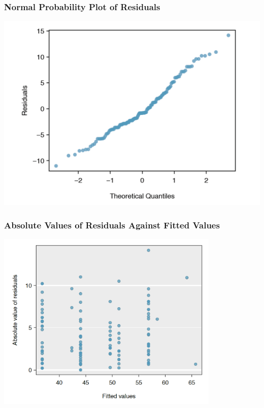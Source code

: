 \documentclass[handout]{beamer}
\begin{document}
\begin{frame}[fragile]
\frametitle{Normal Probability Plot of Residuals}

\begin{center}
\includegraphics[width=\textwidth]{figure/norm_prob_plot.png}
\end{center}

\end{frame}


\begin{frame}[fragile]
\frametitle{Absolute Values of Residuals Against Fitted Values}

\begin{center}
\includegraphics[width=0.8\textwidth]{figure/abs_value.png}
\end{center}

\end{frame}
\end{document}
